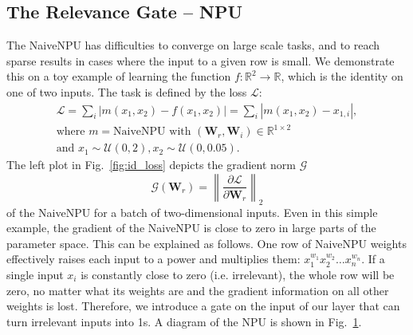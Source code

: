 \documentclass[9pt]{article}
\newcommand{\Wre}{\bm W_{r}}
\newcommand{\Wim}{\bm W_{i}}
\newcommand{\naivenpu}{\text{NaiveNPU}}
\newcommand{\norm}[1]{\left\lVert #1 \right\rVert}
\begin{document}
\begin{figure}
  \begin{minipage}{.45\textwidth}
      \resizebox{0.9\textwidth}{!}{}
      \label{fig:npu_diagram}
  \end{minipage}
  \hspace{0.01\textwidth}
  \begin{minipage}{0.54\textwidth}
    \resizebox{\textwidth}{!}{}
    \label{fig:gatednpu_diagram}
  \end{minipage}
\end{figure}


\subsection{The Relevance Gate -- NPU}%
\label{sub:npu}

The NaiveNPU has difficulties to converge on large scale tasks, and to reach
sparse results in cases where the input to a given row is small. We
demonstrate this on a toy example of learning the function
$f:\mathbb{R}^2 \rightarrow \mathbb{R}$,
which is the identity on one of two inputs. The task is defined by the loss $\mathcal L$:
\begin{gather}
  \mathcal{L} = \sum_i |m(x_1,x_2) - f(x_1,x_2)| = \sum_i |m(x_1,x_2) - x_{1,i}|,\nonumber\\
  \label{eq:grad_surf}
  \text{where } m = \naivenpu \text{ with } (\Wre,\Wim) \in \mathbb{R}^{1\times 2} \\
  \text{and } x_1 \sim \mathcal U(0,2), x_2 \sim \mathcal U(0,0.05). \nonumber
\end{gather}
The left plot in Fig.~\ref{fig:id_loss} depicts the gradient norm $\mathcal{G}$
\begin{equation}
  \mathcal{G}(\Wre) = \norm{\frac{\partial\mathcal{L}}{\partial\Wre}}_2
\end{equation}
of the NaiveNPU for a batch of two-dimensional inputs.
Even in this simple example, the gradient of the NaiveNPU is close to
zero in large parts of the parameter space. This can be explained as follows.
One row of NaiveNPU weights effectively raises each input to a power and
multiplies them: $x_1^{w_1} x_2^{w_2} \dots x_n^{w_n}$. If a single input $x_i$
is constantly close to zero (i.e. irrelevant), the whole row will be zero, no
matter what its weights are and the gradient information on all other weights
is lost.  Therefore, we introduce a gate on the input of our layer that can turn
irrelevant inputs into 1s.
A diagram of the NPU is shown in Fig.~\ref{fig:gatednpu_diagram}.
\end{document}
